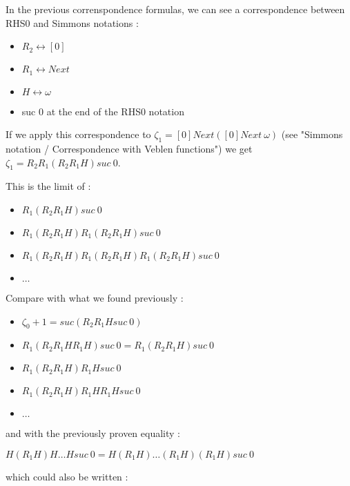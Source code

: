 \documentclass[10pt]{article}
\begin{document}
In the previous correnspondence formulas, we can see a correspondence between RHS0 and Simmons notations :

\begin{itemize}
     \setlength{\itemsep}{1pt}
     \setlength{\parskip}{0pt}
     \setlength{\parsep}{0pt}
\item \( R_2 \leftrightarrow [0] \)
\item \( R_1 \leftrightarrow Next \)
\item \( H \leftrightarrow \omega \)
\item suc 0 at the end of the RHS0 notation
\end{itemize}

If we apply this correspondence to \( \zeta_1 = [0] Next ([0] Next\ \omega) \) (see "Simmons notation / Correspondence with Veblen functions") we get \( \zeta_1 = R_2 R_1 (R_2 R_1 H) suc\ 0 \).

\bigskip

This is the limit of :

\begin{itemize}
     \setlength{\itemsep}{1pt}
     \setlength{\parskip}{0pt}
     \setlength{\parsep}{0pt}
\item \( R_1 (R_2 R_1 H) suc\ 0 \) 
\item \( R_1 (R_2 R_1 H) R_1 (R_2 R_1 H) suc\ 0 \)
\item \( R_1 (R_2 R_1 H) R_1 (R_2 R_1 H) R_1 (R_2 R_1 H) suc\ 0 \)
\item \( \ldots \)
\end{itemize}

Compare with what we found previously :

\begin{itemize}
     \setlength{\itemsep}{1pt}
     \setlength{\parskip}{0pt}
     \setlength{\parsep}{0pt}
\item \( \zeta_0+1 = suc (R_2 R_1 H suc\ 0) \)
\item \( R_1 (R_2 R_1 H R_1 H) suc\ 0 = R_1 (R_2 R_1 H) suc\ 0 \)
\item \( R_1 (R_2 R_1 H) R_1 H suc\ 0 \)
\item \( R_1 (R_2 R_1 H) R_1 H R_1 H suc\ 0 \)
\item \( \ldots \)
\end{itemize}

and with the previously proven equality :

\( H (R_1 H) H \ldots H suc\ 0 = H (R_1 H) \ldots (R_1 H) (R_1 H) suc\ 0 \)

which could also be written :
\end{document}
